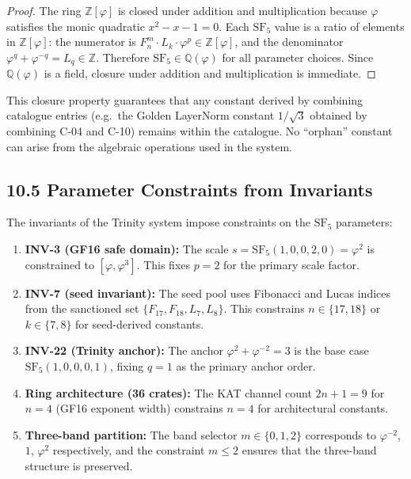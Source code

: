 \begin{proof}
The ring $\mathbb{Z}[\varphi]$ is closed under
addition and multiplication because $\varphi$
satisfies the monic quadratic $x^2 - x - 1 = 0$.
Each $\mathrm{SF}_5$ value is a ratio of elements
in $\mathbb{Z}[\varphi]$: the numerator is
$F_n^m \cdot L_k \cdot \varphi^p \in
\mathbb{Z}[\varphi]$, and the denominator
$\varphi^q + \varphi^{-q} = L_q \in \mathbb{Z}$.
Therefore $\mathrm{SF}_5 \in \mathbb{Q}(\varphi)$
for all parameter choices. Since $\mathbb{Q}(\varphi)$
is a field, closure under addition and multiplication
is immediate.
\end{proof}

This closure property guarantees that any constant
derived by combining catalogue entries (e.g.\ the
Golden LayerNorm constant $1/\sqrt{3}$ obtained by
combining C-04 and C-10) remains within the
catalogue. No ``orphan'' constant can arise from the
algebraic operations used in the system.

\subsection{10.5 Parameter Constraints from
Invariants}\label{fa_29:param-constraints}

The invariants of the Trinity system impose
constraints on the $\mathrm{SF}_5$ parameters:

\begin{enumerate}
\item \textbf{INV-3 (GF16 safe domain):} The scale
$s = \mathrm{SF}_5(1,0,0,2,0) = \varphi^2$ is
constrained to $[\varphi, \varphi^3]$. This fixes
$p = 2$ for the primary scale factor.

\item \textbf{INV-7 (seed invariant):} The seed
pool uses Fibonacci and Lucas indices from the
sanctioned set $\{F_{17}, F_{18}, L_7, L_8\}$.
This constrains $n \in \{17, 18\}$ or $k \in \{7,
8\}$ for seed-derived constants.

\item \textbf{INV-22 (Trinity anchor):} The anchor
$\varphi^2 + \varphi^{-2} = 3$ is the base case
$\mathrm{SF}_5(1,0,0,0,1)$, fixing $q = 1$ as the
primary anchor order.

\item \textbf{Ring architecture (36 crates):} The
KAT channel count $2n+1 = 9$ for $n = 4$ (GF16
exponent width) constrains $n = 4$ for
architectural constants.

\item \textbf{Three-band partition:} The band
selector $m \in \{0, 1, 2\}$ corresponds to
$\varphi^{-2}$, $1$, $\varphi^{2}$ respectively,
and the constraint $m \leq 2$ ensures that the
three-band structure is preserved.
\end{enumerate}


